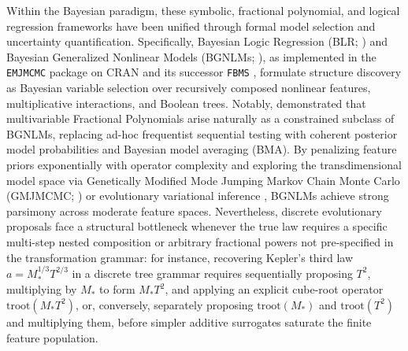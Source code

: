 \documentclass[11pt,a4paper]{article}
\begin{document}
Within the Bayesian paradigm, these symbolic, fractional polynomial, and logical regression frameworks have been unified through formal model selection and uncertainty quantification. Specifically, Bayesian Logic Regression (BLR; \citealp{hubin2020bayesian}) and Bayesian Generalized Nonlinear Models (BGNLMs; \citealp{hubin2021bgnlm, sommerfelt2024evolutionary, hubin2025bgnlm}), as implemented in the \texttt{EMJMCMC} package on CRAN \citep{hubin2021emjmcmc} and its successor \texttt{FBMS} \citep{frommlet2025fbms}, formulate structure discovery as Bayesian variable selection over recursively composed nonlinear features, multiplicative interactions, and Boolean trees. Notably, \citet{hubin2023fractional} demonstrated that multivariable Fractional Polynomials arise naturally as a constrained subclass of BGNLMs, replacing ad-hoc frequentist sequential testing with coherent posterior model probabilities and Bayesian model averaging (BMA). By penalizing feature priors exponentially with operator complexity and exploring the transdimensional model space via Genetically Modified Mode Jumping Markov Chain Monte Carlo (GMJMCMC; \citealp{hubin2018mode, hubin2020bayesian}) or evolutionary variational inference \citep{sommerfelt2024evolutionary}, BGNLMs achieve strong parsimony across moderate feature spaces. Nevertheless, discrete evolutionary proposals face a structural bottleneck whenever the true law requires a specific multi-step nested composition or arbitrary fractional powers not pre-specified in the transformation grammar: for instance, recovering Kepler's third law $a = M_*^{1/3} T^{2/3}$ in a discrete tree grammar requires sequentially proposing $T^2$, multiplying by $M_*$ to form $M_* T^2$, and applying an explicit cube-root operator $\mathrm{troot}(M_* T^2)$, or, conversely, separately proposing $\mathrm{troot}(M_*)$ and $\mathrm{troot}(T^2)$ and multiplying them, before simpler additive surrogates saturate the finite feature population.
\end{document}
